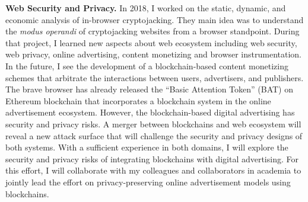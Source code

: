 \documentclass{NSF}
\newcommand{\BfPara}[1]{{\noindent\textbf{#1.}}\xspace}
\begin{document}
\BfPara{Web Security and Privacy} In 2018, I worked on the static, dynamic, and economic analysis of in-browser cryptojacking. They main idea was to understand the {\em modus operandi} of cryptojacking websites from a browser standpoint. During that project, I learned new aspects about web ecosystem including web security, web privacy, online advertising, content monetizing and browser instrumentation. In the future, I see the development of a blockchain-based content monetizing schemes that arbitrate the interactions between users, advertisers, and publishers. The brave browser has already released the ``Basic Attention Token'' (BAT) on Ethereum blockchain that incorporates a blockchain system in the online advertisement ecosystem. However, the blockchain-based digital advertising has security and privacy risks. A merger between blockchains and web ecosystem will reveal a new attack surface that will challenge the security and privacy designs of both systems. With a sufficient experience in both domains, I will explore the security and privacy risks of integrating blockchains with digital advertising. For this effort, I will collaborate with my colleagues and collaborators in academia to jointly lead the effort on privacy-preserving online advertisement models using blockchains. 
\end{document}
